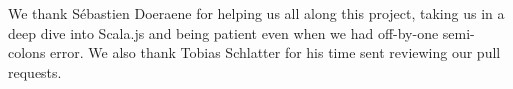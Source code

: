 We thank S\'{e}bastien Doeraene for helping us all along this project,
taking us in a deep dive into Scala.js and being patient even when we had
off-by-one semi-colons error. We also thank Tobias Schlatter for his time
sent reviewing our pull requests.